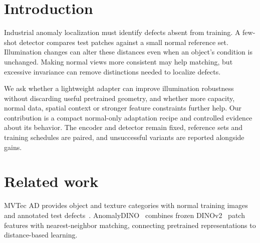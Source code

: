 \begin{abstract}
Illumination changes can disturb few-shot anomaly localization with frozen patch features. We study A1, a 24,992-parameter residual adapter trained on normal images using illumination consistency and a clean-feature anchor, with a frozen DINOv2 encoder and exact nearest-neighbor scoring. After development on three MVTec AD categories, the fixed 16-shot recipe improves six-shift pixel average precision by $1.183\pm0.249$ percentage points on twelve additional categories and $1.341\pm0.249$ points across all fifteen. Paired ablations examine capacity, reference budget, spatial context and loss design. Wider and spatial adapters offer little additional benefit under the common training budget, while stronger feature constraints reduce AP. More references modestly improve both adapted and unadapted detectors at increased memory and scoring cost. These findings support the compact anchored adapter and highlight the balance between illumination consistency and useful feature separation.
\end{abstract}

\section{Introduction}
\label{sec:intro}
Industrial anomaly localization must identify defects absent from training. A few-shot detector compares test patches against a small normal reference set. Illumination changes can alter these distances even when an object's condition is unchanged. Making normal views more consistent may help matching, but excessive invariance can remove distinctions needed to localize defects.

We ask whether a lightweight adapter can improve illumination robustness without discarding useful pretrained geometry, and whether more capacity, normal data, spatial context or stronger feature constraints further help. Our contribution is a compact normal-only adaptation recipe and controlled evidence about its behavior. The encoder and detector remain fixed, reference sets and training schedules are paired, and unsuccessful variants are reported alongside gains.

\section{Related work}
MVTec AD provides object and texture categories with normal training images and annotated test defects~\cite{bergmann2019mvtec}. AnomalyDINO~\cite{damm2025anomalydino} combines frozen DINOv2~\cite{oquab2024dinov2} patch features with nearest-neighbor matching, connecting pretrained representations to distance-based learning.

